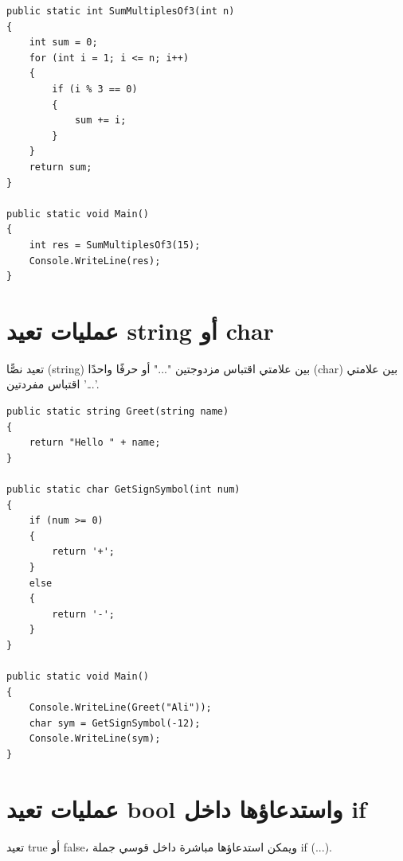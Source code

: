 \documentclass[14pt]{extarticle}
\begin{document}
\begin{boxExample}
\begin{english}
\begin{verbatim}
public static int SumMultiplesOf3(int n)
{
    int sum = 0;
    for (int i = 1; i <= n; i++)
    {
        if (i % 3 == 0)
        {
            sum += i;
        }
    }
    return sum;
}

public static void Main()
{
    int res = SumMultiplesOf3(15);
    Console.WriteLine(res);
}
\end{verbatim}
\end{english}
\end{boxExample}

\filbreak
\section{عمليات تعيد \textenglish{string} أو \textenglish{char}}
تعيد نصًّا (\textenglish{string}) بين علامتي اقتباس مزدوجتين \textenglish{"..."} أو حرفًا واحدًا (\textenglish{char}) بين علامتي اقتباس مفردتين \textenglish{'...'}.

\begin{boxExample}
\begin{english}
\begin{verbatim}
public static string Greet(string name)
{
    return "Hello " + name;
}

public static char GetSignSymbol(int num)
{
    if (num >= 0)
    {
        return '+';
    }
    else
    {
        return '-';
    }
}

public static void Main()
{
    Console.WriteLine(Greet("Ali"));
    char sym = GetSignSymbol(-12);
    Console.WriteLine(sym);
}
\end{verbatim}
\end{english}
\end{boxExample}

\filbreak
\section{عمليات تعيد \textenglish{bool} واستدعاؤها داخل \textenglish{if}}
تعيد \textenglish{true} أو \textenglish{false}، ويمكن استدعاؤها مباشرة داخل قوسي جملة \textenglish{if (...)}.
\end{document}
